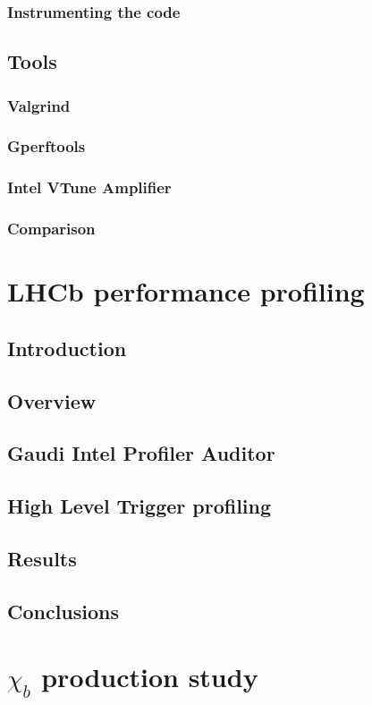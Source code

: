 \documentclass[12pt, a4paper]{article}
\begin{document}
\subsubsection{Instrumenting the code}
\subsection{Tools}
\subsubsection{Valgrind}
\subsubsection{Gperftools}
\subsubsection{Intel VTune Amplifier}
\subsubsection{Comparison}

\section{LHCb performance profiling}
\subsection{Introduction}
\subsection{Overview}
\subsection{Gaudi Intel Profiler Auditor}
\subsection{High Level Trigger profiling}
\subsection{Results}
\subsection{Conclusions}

\section{$\chi_{b}$ production study}
\end{document}
